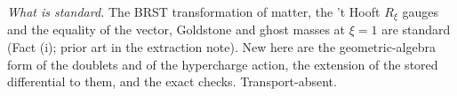 \emph{What is standard.} The BRST transformation of matter, the 't Hooft $R_{\xi}$ gauges and the equality of the vector, Goldstone and ghost masses at $\xi = 1$ are standard (Fact (i); prior art in the extraction note). New here are the geometric-algebra form of the doublets and of the hypercharge action, the extension of the stored differential to them, and the exact checks. Transport-absent.
